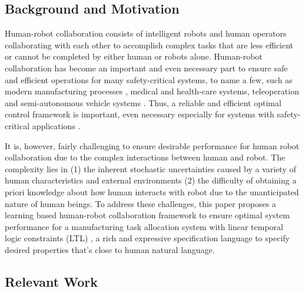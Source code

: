 \documentclass[journal]{IEEEtran}
\begin{document}
\subsection{Background and Motivation}
Human-robot collaboration consists of intelligent robots and human operators collaborating with each other to accomplish complex tasks that are less efficient or cannot be completed by either human or robots alone. Human-robot collaboration has become an important and even necessary part to ensure safe and efficient operations for many safety-critical systems, to name a few, such as modern manufacturing processes \cite{sadrfaridpour2016modeling,chen2014optimal}, medical and health-care systems\cite{broadbent2009acceptance,okamura2010medical}, teleoperation \cite{lin2015experiments} and semi-autonomous vehicle systems \cite{seshia2015formal}. %
Thus, a reliable and efficient optimal control framework is important, even necessary especially for systems with safety-critical applications \cite{zanchettin2016safety}. 

It is, however, fairly challenging to ensure desirable performance for human robot collaboration due to the complex interactions between human and robot. The complexity lies in (1) the inherent stochastic uncertainties caused by a variety of human characteristics and external environments (2) the difficulty of obtaining a priori knowledge about how human interacts with robot due to the unanticipated nature of human beings. To address these challenges, this paper proposes a learning based human-robot collaboration framework to ensure optimal system performance for a manufacturing task allocation system with linear temporal logic constraints (LTL) \cite{baier2008principles}, a rich and expressive specification language to specify desired properties that's close to human natural language.  %
\subsection{Relevant Work}
\end{document}
